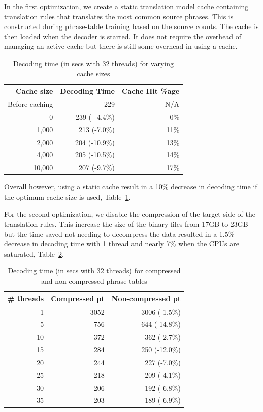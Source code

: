 \documentclass[11pt]{article}
\begin{document}
In the first optimization, we create a static translation model cache containing translation rules that translates the most common source phrases. This is constructed during phrase-table training based on the source counts. The cache is then loaded when the decoder is started. It does not require the overhead of managing an active cache but there is still some overhead in using a cache. 
\begin{table}[h]
\small
\begin{center}
\begin{tabular}{|r|r|r|} \hline
Cache size	& Decoding Time & Cache Hit \%age	\\ \hline
Before caching	& 229	& N/A	 \\
0		& 239 (+4.4\%)	& 0\% \\
1,000		& 213 (-7.0\%)	& 11\% \\
2,000		& 204 (-10.9\%)	& 13\% \\
4,000		& 205 (-10.5\%)	& 14\% \\
10,000		& 207 (-9.7\%)	& 17\% \\ \hline
\end{tabular}
\end{center}
\caption{Decoding time (in secs with 32 threads) for varying cache sizes}
\label{tab:cache}
\end{table}
Overall however, using a static cache result in a 10\% decrease in decoding time if the optimum cache size is used, Table~\ref{tab:cache}.

For the second optimization, we disable the compression of the target side of the translation rules. This increase the size of the binary files from 17GB to 23GB but the time saved not needing to decompress the data resulted in a 1.5\% decrease in decoding time with 1 thread and nearly 7\% when the CPUs are saturated, Table~\ref{tab:compression}.
\begin{table}[h]
\small
\begin{center}
\begin{tabular}{|r|r|r|} \hline
\# threads	& Compressed pt & Non-compressed pt \\ \hline
1		& 3052	& 3006 (-1.5\%) \\
5		& 756	& 644 (-14.8\%) \\
10		& 372	& 362 (-2.7\%) \\
15		& 284	& 250 (-12.0\%) \\
20		& 244	& 227 (-7.0\%) \\
25		& 218	& 209 (-4.1\%) \\
30		& 206	& 192 (-6.8\%) \\
35		& 203	& 189 (-6.9\%) \\ \hline
\end{tabular}
\end{center}
\caption{Decoding time (in secs with 32 threads) for compressed and non-compressed phrase-tables}
\label{tab:compression}
\end{table}
\end{document}
